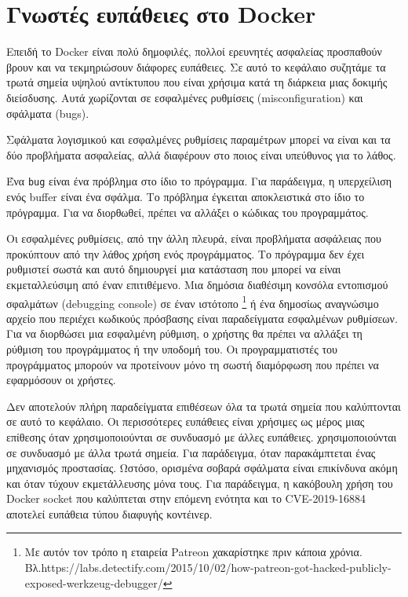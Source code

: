 \chapter{Γνωστές ευπάθειες στο \textlatin{Docker}}
\label{knownDockerCves}

Επειδή το \textlatin{Docker} είναι πολύ δημοφιλές, πολλοί ερευνητές ασφαλείας
προσπαθούν βρουν και να τεκμηριώσουν διάφορες ευπάθειες. Σε αυτό το κεφάλαιο
συζητάμε τα τρωτά σημεία υψηλού αντίκτυπου που είναι χρήσιμα κατά τη διάρκεια
μιας δοκιμής διείσδυσης. Αυτά χωρίζονται σε εσφαλμένες ρυθμίσεις
(\textlatin{misconfiguration}) και σφάλματα (\textlatin{bugs}).

Σφάλματα λογισμικού και εσφαλμένες ρυθμίσεις παραμέτρων μπορεί να είναι και τα
δύο προβλήματα ασφαλείας, αλλά διαφέρουν στο ποιος είναι υπεύθυνος για το λάθος.

Ένα \texttt{\textlatin{bug}} είναι ένα πρόβλημα στο ίδιο το πρόγραμμα. Για
παράδειγμα, η υπερχείλιση ενός \textlatin{buffer} είναι ένα σφάλμα. Το πρόβλημα
έγκειται αποκλειστικά στο ίδιο το πρόγραμμα. Για να διορθωθεί, πρέπει να
αλλάξει ο κώδικας του προγραμμάτος.

Οι εσφαλμένες ρυθμίσεις, από την άλλη πλευρά, είναι προβλήματα ασφάλειας που
προκύπτουν από την λάθος χρήση ενός προγράμματος. Το πρόγραμμα δεν έχει
ρυθμιστεί σωστά και αυτό δημιουργεί μια κατάσταση που μπορεί να είναι
εκμεταλλεύσιμη από έναν επιτιθέμενο. Μια δημόσια διαθέσιμη κονσόλα εντοπισμού
σφαλμάτων (\textlatin{debugging console}) σε έναν ιστότοπο 
\footnote{Με αυτόν τον τρόπο η εταιρεία \textlatin{Patreon} χακαρίστηκε πριν
κάποια χρόνια. Βλ.\textlatin{https://labs.detectify.com/2015/10/02/how-patreon-got-hacked-publicly-exposed-werkzeug-debugger/}}
ή ένα δημοσίως αναγνώσιμο αρχείο που περιέχει κωδικούς πρόσβασης είναι
παραδείγματα εσφαλμένων ρυθμίσεων. Για να διορθώσει μια εσφαλμένη
ρύθμιση, ο χρήστης θα πρέπει να αλλάξει τη ρύθμιση του προγράμματος ή την
υποδομή του. Οι προγραμματιστές του προγράμματος μπορούν να προτείνουν μόνο
τη σωστή διαμόρφωση που πρέπει να εφαρμόσουν οι χρήστες.

Δεν αποτελούν πλήρη παραδείγματα επιθέσεων όλα τα τρωτά σημεία που καλύπτονται
σε αυτό το κεφάλαιο. Οι περισσότερες ευπάθειες είναι χρήσιμες ως μέρος μιας
επίθεσης όταν χρησιμοποιούνται σε συνδυασμό με άλλες ευπάθειες.
χρησιμοποιούνται σε συνδυασμό με άλλα τρωτά σημεία. Για παράδειγμα, όταν
παρακάμπτεται ένας μηχανισμός προστασίας. Ωστόσο, ορισμένα σοβαρά σφάλματα
είναι επικίνδυνα ακόμη και όταν τύχουν εκμετάλλευσης μόνα τους.
Για παράδειγμα, η κακόβουλη χρήση του \textlatin{Docker socket} που καλύπτεται
στην επόμενη ενότητα και το \textlatin{CVE-2019-16884} αποτελεί ευπάθεια τύπου
διαφυγής κοντέινερ.

